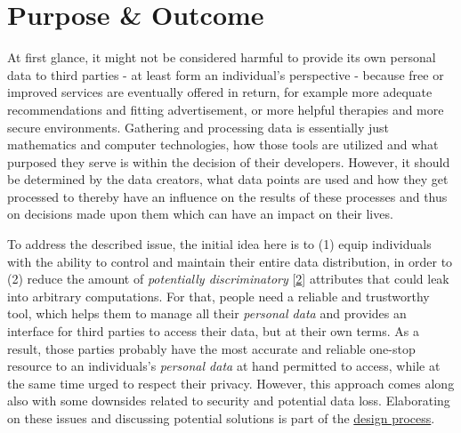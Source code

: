 \documentclass[12pt,english,a4paper,titlepage,cleardoublepage=empty,dottedtoc]{report}
\begin{document}
\section{Purpose \& Outcome}\label{purpose-outcome}

At first glance, it might not be considered harmful to provide its own
personal data to third parties - at least form an individual's
perspective - because free or improved services are eventually offered
in return, for example more adequate recommendations and fitting
advertisement, or more helpful therapies and more secure environments.
Gathering and processing data is essentially just mathematics and
computer technologies, how those tools are utilized and what purposed
they serve is within the decision of their developers. However, it
should be determined by the data creators, what data points are used and
how they get processed to thereby have an influence on the results of
these processes and thus on decisions made upon them which can have an
impact on their lives.

To address the described issue, the initial idea here is to (1) equip
individuals with the ability to control and maintain their entire data
distribution, in order to (2) reduce the amount of \emph{potentially
discriminatory}
{[}\protect\hyperlink{ref-paper_2008_discrimination-aware-data-mining}{2}{]}
attributes that could leak into arbitrary computations. For that, people
need a reliable and trustworthy tool, which helps them to manage all
their \emph{personal data} and provides an interface for third parties
to access their data, but at their own terms. As a result, those parties
probably have the most accurate and reliable one-stop resource to an
individuals's \emph{personal data} at hand permitted to access, while at
the same time urged to respect their privacy. However, this approach
comes along also with some downsides related to security and potential
data loss. Elaborating on these issues and discussing potential
solutions is part of the \protect\hyperlink{design-discussion}{design
process}.
\end{document}
